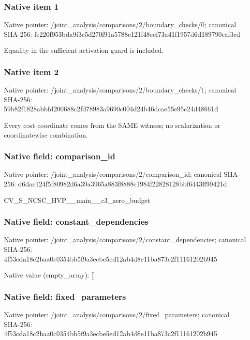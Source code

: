 \documentclass[10pt,a4paper]{article}
\begin{document}
\subsubsection{Native item 1}
Native pointer: /joint\_\allowbreak{}analysis/comparisons/2/boundary\_\allowbreak{}checks/0; canonical SHA-256: fe220f953bda9f3c5d270f91a5788e121f48eef73a41f1957d6d189790caf3cd

\begingroup\raggedright\sloppy Equality in the sufficient activation guard is included.\par\endgroup

\subsubsection{Native item 2}
Native pointer: /joint\_\allowbreak{}analysis/comparisons/2/boundary\_\allowbreak{}checks/1; canonical SHA-256: 59b82f1828abbfd200688c2fd78983a9690c004d24b46dcae55e95c24d48661d

\begingroup\raggedright\sloppy Every cost coordinate comes from the SAME witness;\allowbreak{} no scalarization or coordinatewise combination.\par\endgroup

\subsubsection{Native field: comparison\_\allowbreak{}id}
Native pointer: /joint\_\allowbreak{}analysis/comparisons/2/comparison\_\allowbreak{}id; canonical SHA-256: d6dac124f5f80982d6a39a3965a883f8888c1984f22828128bbf6443ff99421d

\begingroup\raggedright\sloppy CV\_\allowbreak{}S\_\allowbreak{}NCSC\_\allowbreak{}HVP\_\allowbreak{}\_\allowbreak{}main\_\allowbreak{}\_\allowbreak{}c3\_\allowbreak{}zero\_\allowbreak{}budget\par\endgroup

\subsubsection{Native field: constant\_\allowbreak{}dependencies}
Native pointer: /joint\_\allowbreak{}analysis/comparisons/2/constant\_\allowbreak{}dependencies; canonical SHA-256: 4f53cda18c2baa0c0354bb5f9a3ecbe5ed12ab4d8e11ba873c2f11161202b945

Native value (empty\_\allowbreak{}array): []

\subsubsection{Native field: fixed\_\allowbreak{}parameters}
Native pointer: /joint\_\allowbreak{}analysis/comparisons/2/fixed\_\allowbreak{}parameters; canonical SHA-256: 4f53cda18c2baa0c0354bb5f9a3ecbe5ed12ab4d8e11ba873c2f11161202b945
\end{document}
